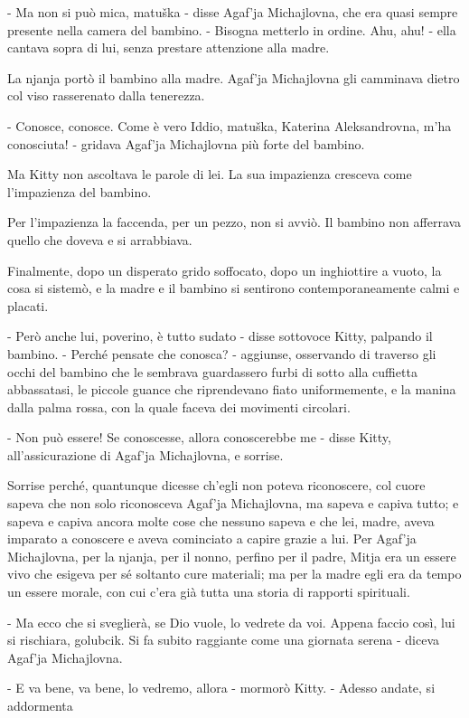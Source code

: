 - Ma non si può mica, matuška - disse Agaf'ja Michajlovna, che era quasi sempre presente nella camera del bambino. - Bisogna metterlo in ordine. Ahu, ahu! - ella cantava sopra di lui, senza prestare attenzione alla madre. 

La njanja portò il bambino alla madre. Agaf'ja Michajlovna gli camminava dietro col viso rasserenato dalla tenerezza. 

- Conosce, conosce. Come è vero Iddio, matuška, Katerina Aleksandrovna, m'ha conosciuta! - gridava Agaf'ja Michajlovna più forte del bambino. 

Ma Kitty non ascoltava le parole di lei. La sua impazienza cresceva come l'impazienza del bambino. 

Per l'impazienza la faccenda, per un pezzo, non si avviò. Il bambino non afferrava quello che doveva e si arrabbiava. 

Finalmente, dopo un disperato grido soffocato, dopo un inghiottire a vuoto, la cosa si sistemò, e la madre e il bambino si sentirono contemporaneamente calmi e placati. 

- Però anche lui, poverino, è tutto sudato - disse sottovoce Kitty, palpando il bambino. - Perché pensate che conosca? - aggiunse, osservando di traverso gli occhi del bambino che le sembrava guardassero furbi di sotto alla cuffietta abbassatasi, le piccole guance che riprendevano fiato uniformemente, e la manina dalla palma rossa, con la quale faceva dei movimenti circolari. 

- Non può essere! Se conoscesse, allora conoscerebbe me - disse Kitty, all'assicurazione di Agaf'ja Michajlovna, e sorrise. 

Sorrise perché, quantunque dicesse ch'egli non poteva riconoscere, col cuore sapeva che non solo riconosceva Agaf'ja Michajlovna, ma sapeva e capiva tutto; e sapeva e capiva ancora molte cose che nessuno sapeva e che lei, madre, aveva imparato a conoscere e aveva cominciato a capire grazie a lui. Per Agaf'ja Michajlovna, per la njanja, per il nonno, perfino per il padre, Mitja era un essere vivo che esigeva per sé soltanto cure materiali; ma per la madre egli era da tempo un essere morale, con cui c'era già tutta una storia di rapporti spirituali. 

- Ma ecco che si sveglierà, se Dio vuole, lo vedrete da voi. Appena faccio così, lui si rischiara, golubcik. Si fa subito raggiante come una giornata serena - diceva Agaf'ja Michajlovna. 

- E va bene, va bene, lo vedremo, allora - mormorò Kitty. - Adesso andate, si addormenta 

